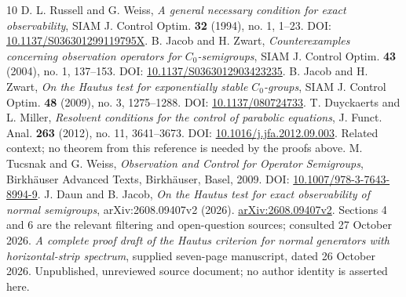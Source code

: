 \documentclass[11pt,a4paper]{article}
\theoremstyle{definition}\newtheorem{definition}[theorem]{Definition}
\theoremstyle{remark}\newtheorem{remark}[theorem]{Remark}
\begin{document}
\begin{thebibliography}{10}
 D. L. Russell and G. Weiss, \emph{A general necessary condition for exact observability}, SIAM J. Control Optim. \textbf{32} (1994), no. 1, 1--23. DOI: \href{https://doi.org/10.1137/S036301299119795X}{10.1137/S036301299119795X}.
 B. Jacob and H. Zwart, \emph{Counterexamples concerning observation operators for $C_0$-semigroups}, SIAM J. Control Optim. \textbf{43} (2004), no. 1, 137--153. DOI: \href{https://doi.org/10.1137/S0363012903423235}{10.1137/S0363012903423235}.
 B. Jacob and H. Zwart, \emph{On the Hautus test for exponentially stable $C_0$-groups}, SIAM J. Control Optim. \textbf{48} (2009), no. 3, 1275--1288. DOI: \href{https://doi.org/10.1137/080724733}{10.1137/080724733}.
 T. Duyckaerts and L. Miller, \emph{Resolvent conditions for the control of parabolic equations}, J. Funct. Anal. \textbf{263} (2012), no. 11, 3641--3673. DOI: \href{https://doi.org/10.1016/j.jfa.2012.09.003}{10.1016/j.jfa.2012.09.003}. Related context; no theorem from this reference is needed by the proofs above.
 M. Tucsnak and G. Weiss, \emph{Observation and Control for Operator Semigroups}, Birkh\"auser Advanced Texts, Birkh\"auser, Basel, 2009. DOI: \href{https://doi.org/10.1007/978-3-7643-8994-9}{10.1007/978-3-7643-8994-9}.
 J. Daun and B. Jacob, \emph{On the Hautus test for exact observability of normal semigroups}, arXiv:2608.09407v2 (2026). \href{https://arxiv.org/abs/2608.09407v2}{arXiv:2608.09407v2}. Sections 4 and 6 are the relevant filtering and open-question sources; consulted 27 October 2026.
 \emph{A complete proof draft of the Hautus criterion for normal generators with horizontal-strip spectrum}, supplied seven-page manuscript, dated 26 October 2026. Unpublished, unreviewed source document; no author identity is asserted here.
\end{thebibliography}
\end{document}

